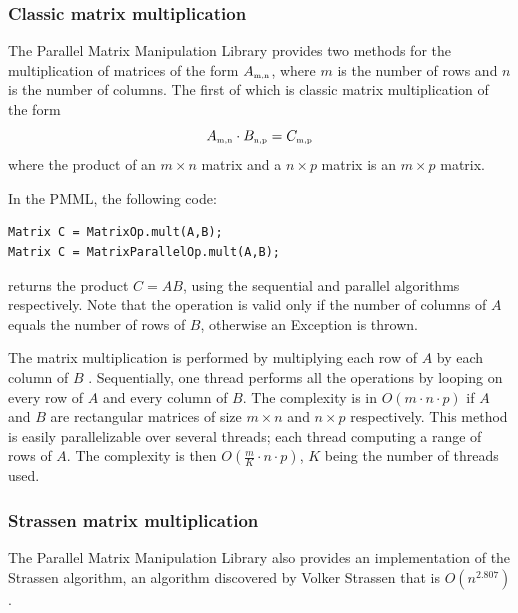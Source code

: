 \documentclass{dependencies/acm_proc_article-sp}
\begin{document}
\subsubsection{Classic matrix multiplication}
The Parallel Matrix Manipulation Library provides two methods for the multiplication of matrices of the form $A_{\mbox{\tiny m,n}}$, where $m$ is the number of rows and $n$ is the number of columns. The first of which is classic matrix multiplication of the form
\begin{equation}
\label{AB=C}
A_{\mbox{\tiny m,n}}\cdot B_{\mbox{\tiny n,p}} = C_{\mbox{\tiny m,p}}
\end{equation}
where the product of an $m\times n$ matrix and a $n\times p$ matrix is an $m\times p$ matrix.

In the PMML, the following code:
\begin{verbatim}
Matrix C = MatrixOp.mult(A,B);
Matrix C = MatrixParallelOp.mult(A,B);
\end{verbatim}
returns the product $C=AB$, using the sequential and parallel algorithms respectively. Note that the operation is valid only if the number of columns of $A$ equals the number of rows of $B$, otherwise an Exception is thrown.

The matrix multiplication is performed by multiplying each row of $A$ by each column of $B$ \cite{MatrixMultiplication}. Sequentially, one thread performs all the operations by looping on every row of $A$ and every column of $B$. The complexity is in $O(m\cdot n\cdot p)$ if $A$ and $B$ are rectangular matrices of size $m\times n$ and $n\times p$ respectively. This method is easily parallelizable over several threads; each thread computing a range of rows of $A$. The complexity is then $O( \frac{m}{K}\cdot n\cdot p )$, $K$ being the number of threads used.

\subsubsection{Strassen matrix multiplication}
The Parallel Matrix Manipulation Library also provides an implementation of the Strassen algorithm, an algorithm discovered by Volker Strassen that is $O( n^{2.807})$ \cite{StrassenAlgorithm}.
\end{document}
